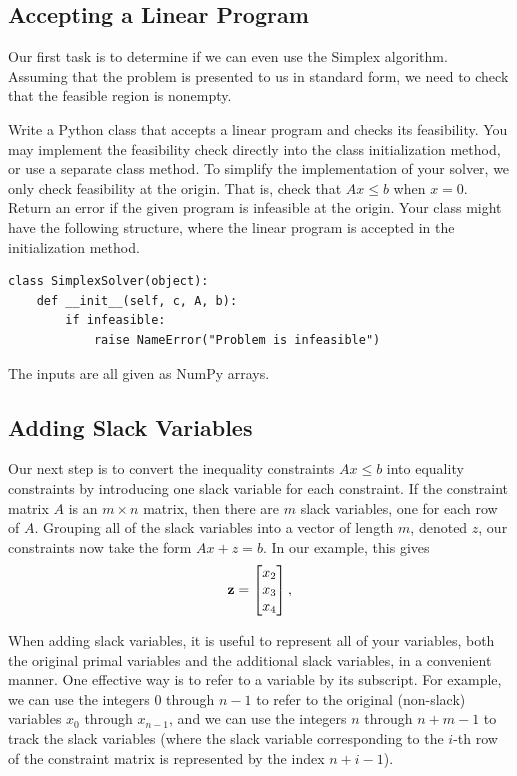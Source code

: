 \subsection{Accepting a Linear Program}
Our first task is to determine if we can even use the Simplex algorithm.
Assuming that the problem is presented to us in standard form, we need
to check that the feasible region is nonempty.

\begin{problem}
Write a Python class that accepts a linear program and checks its feasibility.
You may implement the feasibility check directly into the class initialization method, or use a separate class method.
To simplify the implementation of your solver, we only check feasibility at the origin.
That is, check that $Ax \leq b$ when $x = 0$.
Return an error if the given program is infeasible at the origin.
Your class might have the following structure, where the linear program is accepted in the initialization method.
\begin{lstlisting}
class SimplexSolver(object):
    def __init__(self, c, A, b):
        if infeasible:
            raise NameError("Problem is infeasible")
\end{lstlisting}
\label{prob:initsolver}
\end{problem}
The inputs  are all given as NumPy arrays.
\subsection{Adding Slack Variables}
Our next step is to convert the inequality constraints $Ax \leq b$ into equality constraints
by introducing one slack variable for each constraint.
If the constraint matrix $A$ is an $m \times n$ matrix, then there are $m$ slack variables,
one for each row of $A$.
Grouping all of the slack variables into a vector of length $m$, denoted $z$, our
constraints now take the form $Ax + z = b$.
In our example, this gives 
\[
{\bf z} = \begin{bmatrix}
 x_2 \\
 x_3 \\
 x_4
\end{bmatrix},
\]

When adding slack variables, it is useful to represent all of your variables, both the original primal variables and
the additional slack variables, in a convenient manner.
One effective way is to refer to a variable by its subscript.
For example, we can use the integers $0$ through $n-1$ to refer to the original (non-slack) variables $x_0$ through
$x_{n-1}$, and we can use the integers $n$ through $n+m-1$ to track the slack variables (where the slack variable
corresponding to the $i$-th row of the constraint matrix is represented by the index $n+i-1$).

